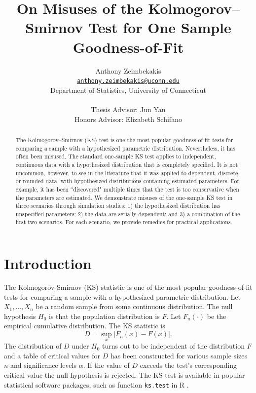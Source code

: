 \documentclass[12pt, letterpaper, titlepage]{article}
\title{On Misuses of the Kolmogorov--Smirnov Test for One Sample Goodness-of-Fit}
\author{Anthony Zeimbekakis\\
\href{mailto:anthony.zeimbekakis@uconn.edu}
{\nolinkurl{anthony.zeimbekakis@uconn.edu}}\\
Department of Statistics, University of Connecticut\\\\
Thesis Advisor: Jun Yan\\
Honors Advisor: Elizabeth Schifano}
\date{}
\begin{document}
\maketitle

\doublespace

\begin{abstract}
The Kolmogorov--Smirnov (KS) test is one the most popular goodness-of-fit tests 
for comparing a sample with a hypothesized parametric distribution. 
Nevertheless, it has often been misused. The standard one-sample KS test applies
to independent, continuous data with a hypothesized distribution that is 
completely specified. It is not uncommon, however, to see in the literature that
it was applied to dependent, discrete, or rounded data, with hypothesized 
distributions containing estimated parameters. For example, it has been 
``discovered" multiple times that the test is too conservative when the 
parameters are estimated. We demonstrate misuses of the one-sample KS test in 
three scenarios through simulation studies:
1) the hypothesized distribution has unspecified parameters;
2) the data are serially dependent; and
3) a combination of the first two scenarios.
For each scenario, we provide remedies for practical applications.
\end{abstract}

\section{Introduction}
\label{sec:intro}

The Kolmogorov-Smirnov (KS) statistic is one of the most popular goodness-of-fit 
tests for comparing a sample with a hypothesized parametric distribution.
Let $X_1, ..., X_n$ be a random sample from some continuous distribution. 
The null hypothesis $H_0$ is that the population distribution is $F$.
Let $F_n(\cdot)$ be the empirical cumulative distribution. The KS statistic is
\begin{equation}
  \label{eq:ks_standard}
  D = \sup_x | F_{n}(x) - F(x) |.
\end{equation}
The distribution of $D$ under $H_0$ turns out to be independent of the
distribution $F$ and a table of critical values for $D$ has been constructed
\citep{Massey} for various sample sizes $n$ and significance 
levels $\alpha$. If the value of $D$ exceeds the test's corresponding critical 
value the null hypothesis is rejected. The KS test is available in popular 
statistical software packages, such as function \texttt{ks.test} in R 
\citep{R, Marsaglia}.
\end{document}
